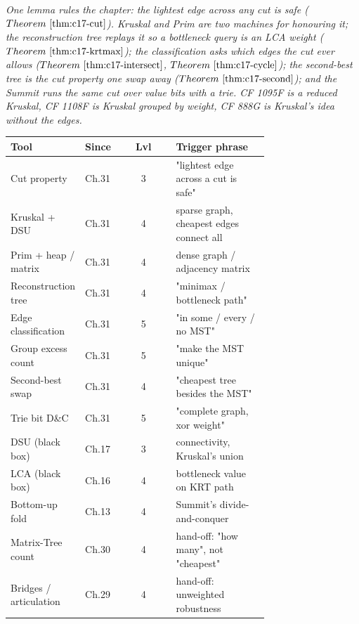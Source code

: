 \begin{recallbox}
\emph{One lemma rules the chapter: the lightest edge across any cut is safe
(\(\thmref{c17-cut}\)).  Kruskal and Prim are two machines for honouring it; the
reconstruction tree replays it so a bottleneck query is an LCA weight
(\(\thmref{c17-krtmax}\)); the classification asks which edges the cut ever allows
(\(\thmref{c17-intersect}\), \(\thmref{c17-cycle}\)); the second-best tree is the
cut property one swap away (\(\thmref{c17-second}\)); and the Summit runs the same
cut over value bits with a trie.  CF 1095F is a reduced Kruskal, CF 1108F is
Kruskal grouped by weight, CF 888G is Kruskal's idea without the edges.}
\end{recallbox}


\begin{center}
\renewcommand{\arraystretch}{1.2}\setlength{\tabcolsep}{3pt}
\begin{tabular}{@{}p{0.26\linewidth} >{\raggedright\arraybackslash}p{0.11\linewidth} c >{\raggedright\arraybackslash}p{0.36\linewidth}@{}}
\toprule
\textbf{Tool} & \textbf{Since} & \textbf{Lvl} & \textbf{Trigger phrase}\\
\midrule
Cut property & Ch.31 & 3 & "lightest edge across a cut is safe"\\
Kruskal + DSU & Ch.31 & 4 & sparse graph, cheapest edges connect all\\
Prim + heap / matrix & Ch.31 & 4 & dense graph / adjacency matrix\\
Reconstruction tree & Ch.31 & 4 & "minimax / bottleneck path"\\
Edge classification & Ch.31 & 5 & "in some / every / no MST"\\
Group excess count & Ch.31 & 5 & "make the MST unique"\\
Second-best swap & Ch.31 & 4 & "cheapest tree besides the MST"\\
Trie bit D\&C & Ch.31 & 5 & "complete graph, xor weight"\\
DSU (black box) & Ch.17 & 3 & connectivity, Kruskal's union\\
LCA (black box) & Ch.16 & 4 & bottleneck value on KRT path\\
Bottom-up fold & Ch.13 & 4 & Summit's divide-and-conquer\\
Matrix-Tree count & Ch.30 & 4 & hand-off: "how many", not "cheapest"\\
Bridges / articulation & Ch.29 & 4 & hand-off: unweighted robustness\\
\bottomrule
\end{tabular}
\end{center}

